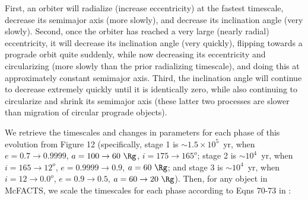 First, an orbiter will radialize (increase eccentricity) at the fastest timescale, decrease its semimajor axis (more slowly), and decrease its inclination angle (very slowly).
Second, once the orbiter has reached a very large (nearly radial) eccentricity, it will decrease its inclination angle (very quickly), flipping towards a prograde orbit quite suddenly, while now decreasing its eccentricity and circularizing (more slowly than the prior radializing timescale), and doing this at approximately constant semimajor axis.
Third, the inclination angle will continue to decrease extremely quickly until it is identically zero, while also continuing to circularize and shrink its semimajor axis (these latter two processes are slower than migration of circular prograde objects).

We retrieve the timescales and changes in parameters for each phase of this evolution from Figure 12 (specifically, stage 1 is $\sim1.5\times10^5$~yr, when $e=0.7\rightarrow 0.9999$, $a=100\rightarrow60~\Rg$, $i=175\rightarrow165^{o}$; stage 2 is $\sim10^4$~yr, when $i=165\rightarrow12^{o}$, $e=0.9999\rightarrow0.9$, $a=60~\Rg$; and stage 3 is $\sim10^4$~yr, when $i=12\rightarrow0.0^{o}$, $e=0.9\rightarrow0.5$, $a=60\rightarrow20~\Rg$).
Then, for any object in McFACTS, we scale the timescales for each phase according to Eqns 70-73 in \cite{WangZhuLin24}:

